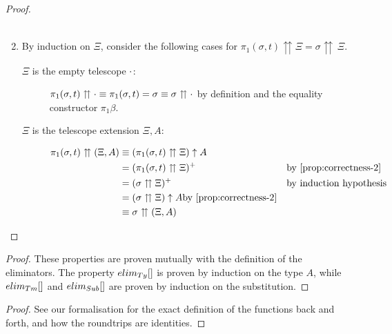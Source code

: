 \documentclass[a4paper,UKenglish,numberwithinsect,cleveref,thm-restate]{lipics-v2021}
\begin{document}
\begin{proof}
\begin{enumerate}
\begin{description}
\begin{align*}
          \end{align*}
      \end{description}
    \item By induction on $\Xi$, consider the following cases for $\pi_1(\sigma, t) \upuparrows \Xi = \sigma \upuparrows\,\Xi$.
      \begin{description}
        \item[$\Xi$ is the empty telescope $\cdot$:] $\pi_1(\sigma, t) \upuparrows \cdot \equiv \pi_1(\sigma, t) = \sigma \equiv \sigma \upuparrows \cdot$ by definition and the equality constructor $\pi_1\beta$.
        \item[$\Xi$ is the telescope extension $\Xi, A$:] 
          \begin{align*}
            \pi_1(\sigma, t) \upuparrows (\Xi, A) & \judgeq (\pi_1(\sigma, t) \upuparrows \Xi) \uparrow A \\
                                                  & = (\pi_1(\sigma, t) \upuparrows \Xi)^{+} && \text{by \cref{prop:correctness-2}} \\
                                                  & = (\sigma\upuparrows \Xi)^{+} && \text{by induction hypothesis} \\
                                                  & = (\sigma \upuparrows \Xi) \uparrow A \text{by \cref{prop:correctness-2}}\\
                                                  & \judgeq \sigma \upuparrows (\Xi , A)
          \end{align*}
      \end{description}
  \end{enumerate}
\end{proof}

\propProvableFunc*
\begin{proof}
  These properties are proven mutually with the definition of the
  eliminators. The property $\elim_{\Ty}[]$ is proven by induction on the type $A$, while $\elim_{\Tm}[]$ and $\elim_{\Sub}[]$ are proven by induction on the substitution.
\end{proof}

\equivalence*
\begin{proof}
  See our \Agda formalisation for the exact definition of the functions back and forth, and how the roundtrips are identities.
\end{proof}
\end{document}
